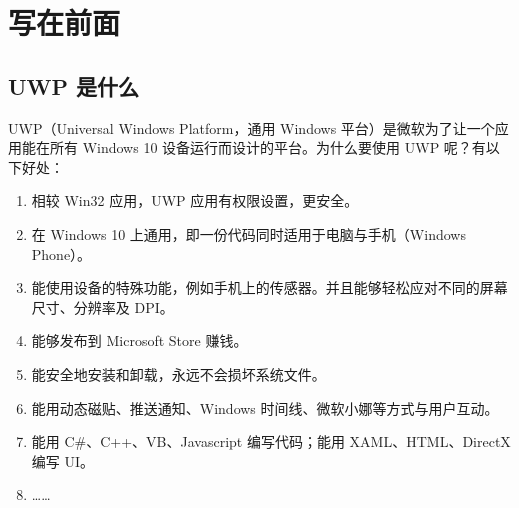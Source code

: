 




\section{写在前面}

\subsection{UWP 是什么}

UWP（Universal Windows Platform，通用 Windows 平台）是微软为了让一个应用能在所有 Windows 10 设备运行而设计的平台\cite{UWPbaidu}。为什么要使用 UWP 呢？有以下好处\cite{UWPMS}：

\begin{enumerate}
    \item 相较 Win32 应用，UWP 应用有权限设置，更安全。
    \item 在 Windows 10 上通用，即一份代码同时适用于电脑与手机（Windows Phone）。
    \item 能使用设备的特殊功能，例如手机上的传感器。并且能够轻松应对不同的屏幕尺寸、分辨率及 DPI。
    \item 能够发布到 Microsoft Store 赚钱。
    \item 能安全地安装和卸载，永远不会损坏系统文件。
    \item 能用动态磁贴、推送通知、Windows 时间线、微软小娜等方式与用户互动。
    \item 能用 C\#、C++、VB、Javascript 编写代码；能用 XAML、HTML、DirectX 编写 UI。
    \item ……
\end{enumerate}

